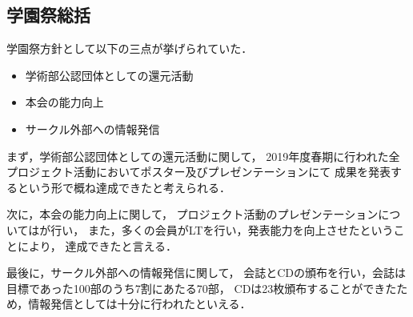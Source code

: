 \subsection*{学園祭総括}

学園祭方針として以下の三点が挙げられていた．

\begin{itemize}
    \item 学術部公認団体としての還元活動
    \item 本会の能力向上
    \item サークル外部への情報発信
\end{itemize}

まず，学術部公認団体としての還元活動に関して，
2019年度春期に行われた全プロジェクト活動においてポスター及びプレゼンテーションにて
成果を発表するという形で概ね達成できたと考えられる．

次に，本会の能力向上に関して，
プロジェクト活動のプレゼンテーションについては\firstGrade{}が行い，
また，多くの会員がLTを行い，発表能力を向上させたということにより，
達成できたと言える．

最後に，サークル外部への情報発信に関して，
会誌とCDの頒布を行い，会誌は目標であった100部のうち7割にあたる70部，
CDは23枚頒布することができたため，情報発信としては十分に行われたといえる．